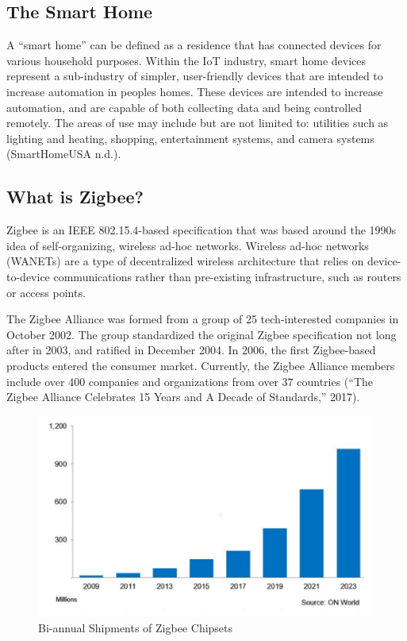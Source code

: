 \subsection{The Smart Home}
A “smart home” can be defined as a residence that has connected devices for various household purposes. Within the IoT industry, smart home devices represent a sub-industry of simpler, user-friendly devices that are intended to increase automation in peoples homes. These devices are intended to increase automation, and are capable of both collecting data and being controlled remotely. The areas of use may include but are not limited to: utilities such as lighting and heating, shopping, entertainment systems, and camera systems (SmartHomeUSA n.d.).

\subsection{What is Zigbee?}
Zigbee is an IEEE 802.15.4-based specification that was based around the 1990s idea of self-organizing, wireless ad-hoc networks. Wireless ad-hoc networks (WANETs) are a type of decentralized wireless architecture that relies on device-to-device communications rather than pre-existing infrastructure, such as routers or access points. 

The Zigbee Alliance was formed from a group of 25 tech-interested companies in October 2002. The group standardized the original Zigbee specification not long after in 2003, and ratified in December 2004. In 2006, the first Zigbee-based products entered the consumer market. Currently, the Zigbee Alliance members include over 400 companies and organizations from over 37 countries (“The Zigbee Alliance Celebrates 15 Years and A Decade of Standards,” 2017).

\begin{figure}[h]
	\caption{Bi-annual Shipments of Zigbee Chipsets}
	\includegraphics[width=1.0\textwidth]{sets}
\end{figure}

